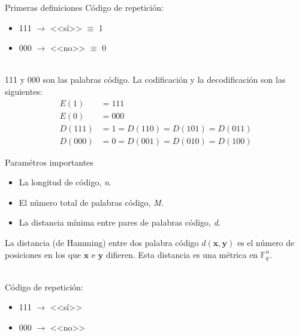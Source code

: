 \documentclass[aspectratio=43,14pt,spanish]{beamer}
\newcommand{\x}{\mathbf{x}}
\newcommand{\y}{\mathbf{y}}
\newcommand{\Fqn}{\mathbb{F}_q^n}
\theoremstyle{definition} %
\begin{document}
    \begin{frame}{Primeras definiciones}
        Código de repetición:
        \begin{itemize}
            \item 111 $\rightarrow$ <<sí>> $\equiv$ 1
            \item 000 $\rightarrow$ <<no>> $\equiv$ 0
        \end{itemize}

        \ \\

        111 y 000 son las palabras código. La codificación y la decodificación son las siguientes:
        \begin{align*}
            E(1) &= 111 \\
            E(0) &= 000 \\
            D(111) &= 1 = D(110) = D(101) = D(011) \\
            D(000) &= 0 = D(001) = D(010) = D(100)
        \end{align*}
    \end{frame}

    \begin{frame}{Paramétros importantes}
        \begin{itemize}
            \item La longitud de código, \emph{n}.
            \item El número total de palabras código, \emph{M}.
            \item La distancia mínima entre pares de palabras código, \emph{d}.
        \end{itemize}

        La distancia (de Hamming) entre dos palabra código $d(\x, \y)$ es el número de posiciones en los que $\x$ e $\y$ difieren. Esta distancia es una métrica en $\Fqn$.

        \ \\

        Código de repetición: 
        \begin{itemize}
            \item 111 $\rightarrow$ <<sí>>
            \item 000 $\rightarrow$ <<no>>
        \end{itemize}

    \end{frame}
\end{document}
